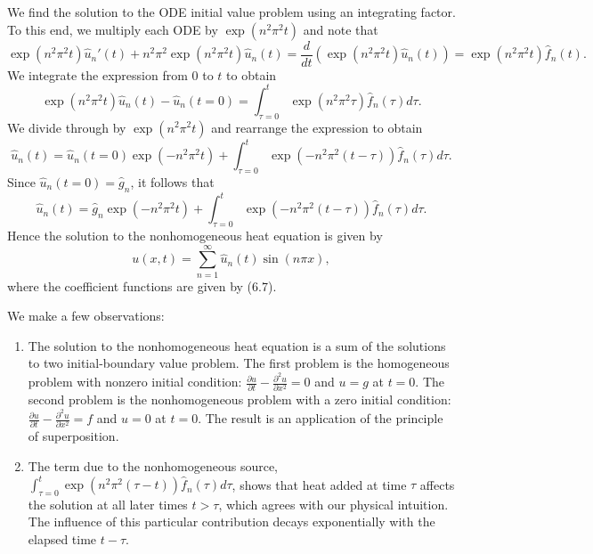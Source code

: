 We find the solution to the ODE initial value problem using an integrating factor. To this end, we multiply each ODE by $\exp(n^2\pi^2 t)$ and note that
\[\exp(n^2\pi^2 t) \hat{u}_n'(t) + n^2\pi^2 \exp(n^2\pi^2 t) \hat{u}_n(t) = \frac{d}{dt}\left(\exp(n^2\pi^2 t) \hat{u}_n(t)\right) = \exp(n^2\pi^2 t) \hat{f}_n(t).\]
We integrate the expression from $0$ to $t$ to obtain
\[\exp(n^2\pi^2 t) \hat{u}_n(t) - \hat{u}_n(t = 0) = \int_{\tau=0}^{t} \exp(n^2\pi^2 \tau) \hat{f}_n(\tau) d\tau.\]
We divide through by $\exp(n^2\pi^2 t)$ and rearrange the expression to obtain
\[\hat{u}_n(t) = \hat{u}_n(t = 0) \exp(-n^2\pi^2 t) + \int_{\tau=0}^{t} \exp(-n^2\pi^2(t - \tau)) \hat{f}_n(\tau) d\tau.\]
Since $\hat{u}_n(t = 0) = \hat{g}_n$, it follows that
\begin{equation*}
    \hat{u}_n(t) = \hat{g}_n \exp(-n^2\pi^2 t) + \int_{\tau=0}^{t} \exp(-n^2\pi^2(t - \tau)) \hat{f}_n(\tau) d\tau. \tag{6.7}
\end{equation*}
Hence the solution to the nonhomogeneous heat equation is given by
\[u(x, t) = \sum_{n=1}^{\infty} \hat{u}_n(t) \sin(n\pi x),\]
where the coefficient functions are given by (6.7).

We make a few observations:
\begin{enumerate}
    \item The solution to the nonhomogeneous heat equation is a sum of the solutions to two initial-boundary value problem. The first problem is the homogeneous problem with nonzero initial condition: $\frac{\partial u}{\partial t} - \frac{\partial^2 u}{\partial x^2} = 0$ and $u = g$ at $t = 0$. The second problem is the nonhomogeneous problem with a zero initial condition: $\frac{\partial u}{\partial t} - \frac{\partial^2 u}{\partial x^2} = f$ and $u = 0$ at $t = 0$. The result is an application of the principle of superposition.
    \item The term due to the nonhomogeneous source, $\int_{\tau=0}^{t} \exp(n^2\pi^2(\tau - t)) \hat{f}_n(\tau) d\tau$, shows that heat added at time $\tau$ affects the solution at all later times $t > \tau$, which agrees with our physical intuition. The influence of this particular contribution decays exponentially with the elapsed time $t - \tau$.
\end{enumerate}

